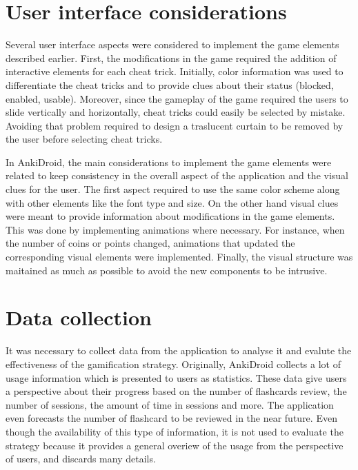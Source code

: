 \section{User interface considerations}
Several user interface aspects were considered to implement the game elements described earlier. First, the modifications in the game required the addition of interactive elements for each cheat trick. Initially, color information was used to differentiate the cheat tricks and to provide clues about their status (blocked, enabled, usable). Moreover, since the gameplay of the game required the users to slide vertically and horizontally, cheat tricks could easily be selected by mistake. Avoiding that problem required to design a traslucent curtain to be removed by the user before selecting cheat tricks.

In AnkiDroid, the main considerations to implement the game elements were related to keep consistency in the overall aspect of the application and the visual clues for the user. The first aspect required to use the same color scheme along with other elements like the font type and size. On the other hand visual clues were meant to provide information about modifications in the game elements. This was done by implementing animations where necessary. For instance, when the number of coins or points changed, animations that updated the corresponding visual elements were implemented. Finally, the visual structure was maitained as much as possible to avoid the new components to be intrusive.

\section{Data collection}
It was necessary to collect data from the application to analyse it and evalute the effectiveness of the gamification strategy. Originally, AnkiDroid collects a lot of usage information which is presented to users as statistics. These data give users a perspective about their progress based on the number of flashcards review, the number of sessions, the amount of time in sessions and more. The application even forecasts the number of flashcard to be reviewed in the near future. Even though the availability of this type of information, it is not used to evaluate the strategy because it provides a general overiew of the usage from the perspective of users, and discards many details.

